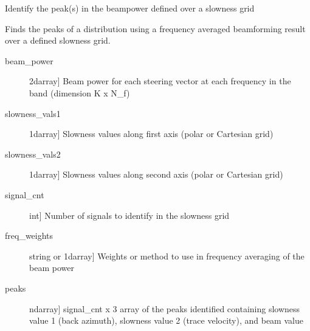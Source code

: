 \documentclass[letterpaper,10pt,english]{sphinxmanual}
\begin{document}

\begin{fulllineitems}
\label{\detokenize{infrapy.detection:infrapy.detection.beamforming_new.find_peaks}}
Identify the peak(s) in the beampower defined over a slowness grid

Finds the peaks of a distribution using a frequency averaged beamforming result
over a defined slowness grid.
\begin{description}
\item[{beam\_power}] \leavevmode{[}2darray{]}
Beam power for each steering vector at each frequency in the
band (dimension K x N\_f)

\item[{slowness\_vals1}] \leavevmode{[}1darray{]}
Slowness values along first axis (polar or Cartesian grid)

\item[{slowness\_vals2}] \leavevmode{[}1darray{]}
Slowness values along second axis (polar or Cartesian grid)

\item[{signal\_cnt}] \leavevmode{[}int{]}
Number of signals to identify in the slowness grid

\item[{freq\_weights}] \leavevmode{[}string or 1darray{]}
Weights or method to use in frequency averaging of the beam power

\end{description}
\begin{description}
\item[{peaks}] \leavevmode{[}ndarray{]}
signal\_cnt x 3 array of the peaks identified containing slowness
value 1 (back azimuth), slowness value 2 (trace velocity),
and beam value

\end{description}

\end{fulllineitems}

\end{document}
